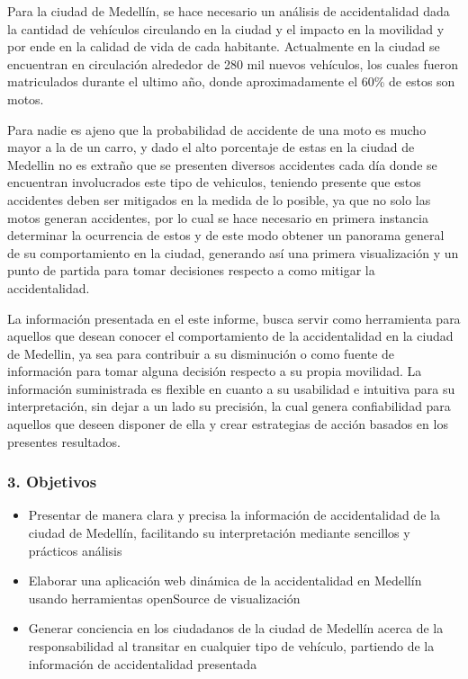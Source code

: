 \documentclass[]{article}
\begin{document}
Para la ciudad de Medellín, se hace necesario un análisis de
accidentalidad dada la cantidad de vehículos circulando en la ciudad y
el impacto en la movilidad y por ende en la calidad de vida de cada
habitante. Actualmente en la ciudad se encuentran en circulación
alrededor de 280 mil nuevos vehículos, los cuales fueron matriculados
durante el ultimo año, donde aproximadamente el 60\% de estos son motos.

Para nadie es ajeno que la probabilidad de accidente de una moto es
mucho mayor a la de un carro, y dado el alto porcentaje de estas en la
ciudad de Medellin no es extraño que se presenten diversos accidentes
cada día donde se encuentran involucrados este tipo de vehiculos,
teniendo presente que estos accidentes deben ser mitigados en la medida
de lo posible, ya que no solo las motos generan accidentes, por lo cual
se hace necesario en primera instancia determinar la ocurrencia de estos
y de este modo obtener un panorama general de su comportamiento en la
ciudad, generando así una primera visualización y un punto de partida
para tomar decisiones respecto a como mitigar la accidentalidad.

La información presentada en el este informe, busca servir como
herramienta para aquellos que desean conocer el comportamiento de la
accidentalidad en la ciudad de Medellin, ya sea para contribuir a su
disminución o como fuente de información para tomar alguna decisión
respecto a su propia movilidad. La información suministrada es flexible
en cuanto a su usabilidad e intuitiva para su interpretación, sin dejar
a un lado su precisión, la cual genera confiabilidad para aquellos que
deseen disponer de ella y crear estrategias de acción basados en los
presentes resultados.

\hypertarget{objetivos}{%
\subsubsection{3. Objetivos}\label{objetivos}}

\begin{itemize}
\item
  Presentar de manera clara y precisa la información de accidentalidad
  de la ciudad de Medellín, facilitando su interpretación mediante
  sencillos y prácticos análisis
\item
  Elaborar una aplicación web dinámica de la accidentalidad en Medellín
  usando herramientas openSource de visualización
\item
  Generar conciencia en los ciudadanos de la ciudad de Medellín acerca
  de la responsabilidad al transitar en cualquier tipo de vehículo,
  partiendo de la información de accidentalidad presentada
\end{itemize}
\end{document}
